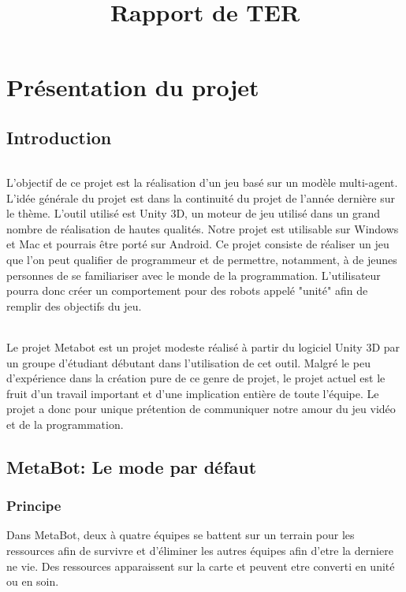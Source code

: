\documentclass{report}
\title{Rapport de TER}
\begin{document}
\maketitle
\newpage
\tableofcontents
\newpage

\part{Présentation du projet}
\chapter{Introduction}
\paragraph{}
L'objectif de ce projet est la réalisation d'un jeu basé sur un modèle multi-agent. L'idée générale du projet est dans la continuité du projet de l'année dernière sur le thème. L'outil utilisé est Unity 3D, un moteur de jeu utilisé dans un grand nombre de réalisation de hautes qualités. Notre projet est utilisable sur Windows et Mac et pourrais être porté sur Android.
Ce projet consiste de réaliser un jeu que l'on peut qualifier de programmeur et de permettre, notamment, à de jeunes personnes de se familiariser avec le monde de la programmation. L'utilisateur pourra donc créer un comportement pour des robots appelé "unité" afin de remplir des objectifs du jeu.
\paragraph{}
Le projet Metabot est un projet modeste réalisé à partir du logiciel Unity 3D par un groupe d'étudiant débutant dans l'utilisation de cet outil. Malgré le peu d'expérience dans la création pure de ce genre de projet, le projet actuel est le fruit d'un travail important et d'une implication entière de toute l'équipe.
Le projet a donc pour unique prétention de communiquer notre amour du jeu vidéo et de la programmation.
\newpage
\chapter{MetaBot: Le mode par défaut}
\section{Principe}
Dans MetaBot, deux à quatre équipes se battent sur un terrain pour les ressources afin de survivre et d'éliminer les autres équipes afin d'etre la derniere ne vie. Des ressources apparaissent sur la carte et peuvent etre converti en unité ou en soin.
\end{document}
